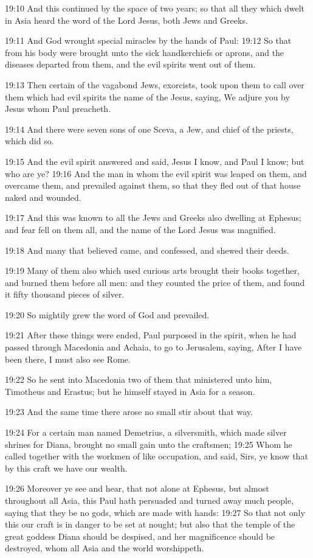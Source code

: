 19:10 And this continued by the space of two years; so that all they which dwelt in Asia heard the word of the Lord Jesus, both Jews and Greeks.

19:11 And God wrought special miracles by the hands of Paul: 19:12 So that from his body were brought unto the sick handkerchiefs or aprons, and the diseases departed from them, and the evil spirits went out of them.

19:13 Then certain of the vagabond Jews, exorcists, took upon them to call over them which had evil spirits the name of the \LORD Jesus, saying, We adjure you by Jesus whom Paul preacheth.

19:14 And there were seven sons of one Sceva, a Jew, and chief of the priests, which did so.

19:15 And the evil spirit answered and said, Jesus I know, and Paul I know; but who are ye?  19:16 And the man in whom the evil spirit was leaped on them, and overcame them, and prevailed against them, so that they fled out of that house naked and wounded.

19:17 And this was known to all the Jews and Greeks also dwelling at Ephesus; and fear fell on them all, and the name of the Lord Jesus was magnified.

19:18 And many that believed came, and confessed, and shewed their deeds.

19:19 Many of them also which used curious arts brought their books together, and burned them before all men: and they counted the price of them, and found it fifty thousand pieces of silver.

19:20 So mightily grew the word of God and prevailed.

19:21 After these things were ended, Paul purposed in the spirit, when he had passed through Macedonia and Achaia, to go to Jerusalem, saying, After I have been there, I must also see Rome.

19:22 So he sent into Macedonia two of them that ministered unto him, Timotheus and Erastus; but he himself stayed in Asia for a season.

19:23 And the same time there arose no small stir about that way.

19:24 For a certain man named Demetrius, a silversmith, which made silver shrines for Diana, brought no small gain unto the craftsmen; 19:25 Whom he called together with the workmen of like occupation, and said, Sirs, ye know that by this craft we have our wealth.

19:26 Moreover ye see and hear, that not alone at Ephesus, but almost throughout all Asia, this Paul hath persuaded and turned away much people, saying that they be no gods, which are made with hands: 19:27 So that not only this our craft is in danger to be set at nought; but also that the temple of the great goddess Diana should be despised, and her magnificence should be destroyed, whom all Asia and the world worshippeth.


